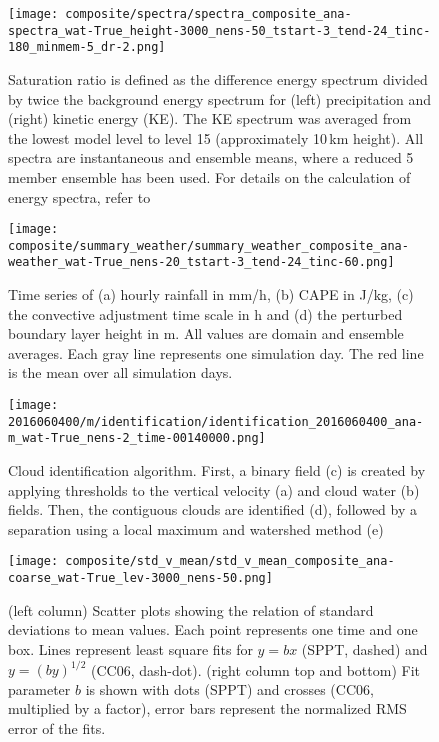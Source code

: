 \documentclass[a4paper, 12pt]{article}
\begin{document}
\begin{figure}[h!]
\noindent \centering
\texttt{[image: composite/spectra/spectra\_composite\_ana-spectra\_wat-True\_height-3000\_nens-50\_tstart-3\_tend-24\_tinc-180\_minmem-5\_dr-2.png]}\\
\caption{Saturation ratio is defined as the difference energy spectrum divided by twice the background energy spectrum for (left) precipitation and (right) kinetic energy (KE). The KE spectrum was averaged from the lowest model level to level 15 (approximately 10\,km height). All spectra are instantaneous and ensemble means, where a reduced 5 member ensemble has been used. For details on the calculation of energy spectra, refer to \cite{Selz2015b}} \label{fig:spectra}
\end{figure}

\begin{figure}[h!]
\noindent \centering
\texttt{[image: composite/summary\_weather/summary\_weather\_composite\_ana-weather\_wat-True\_nens-20\_tstart-3\_tend-24\_tinc-60.png]}\\
\caption{Time series of (a) hourly rainfall in mm/h, (b) CAPE in J/kg, (c) the convective adjustment time scale in h and (d) the perturbed boundary layer height in m. All values are domain and ensemble averages. Each gray line represents one simulation day. The red line is the mean over all simulation days.} \label{fig:summary_weather}
\end{figure}

\begin{figure}[ht]
\noindent \centering
\texttt{[image: 2016060400/m/identification/identification\_2016060400\_ana-m\_wat-True\_nens-2\_time-00140000.png]}\\
\caption{Cloud identification algorithm. First, a binary field (c) is created by applying thresholds to the vertical velocity (a) and cloud water (b) fields. Then, the contiguous clouds are identified (d), followed by a separation using a local maximum and watershed method (e)} \label{fig:Fig4}
\end{figure}


\begin{figure}[ht]
\noindent \centering
\texttt{[image: composite/std\_v\_mean/std\_v\_mean\_composite\_ana-coarse\_wat-True\_lev-3000\_nens-50.png]}\\
\caption{(left column) Scatter plots showing the relation of standard deviations to mean values. Each point represents one time and one box. Lines represent least square fits for $y=bx$ (SPPT, dashed) and $y = (by)^{1/2}$ (CC06, dash-dot). (right column top and bottom) Fit parameter $b$ is shown with dots (SPPT) and crosses (CC06, multiplied by a factor), error bars represent the normalized RMS error of the fits.} \label{fig:std_v_mean}
\end{figure}
\end{document}
